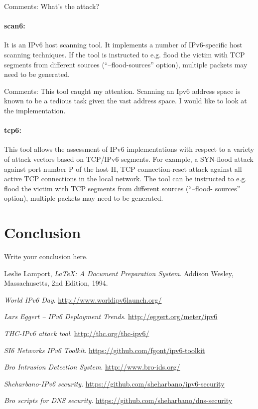 \documentclass{article}
\begin{document}
Comments: What's the attack?

\paragraph*{scan6:} It is an IPv6 host scanning tool. It implements a number of IPv6-specific host scanning techniques. If the tool is instructed to e.g. flood the victim with TCP segments from different sources (“--flood-sources” option), multiple packets may need to be generated.

Comments: This tool caught my attention. Scanning an Ipv6 address space is known to be a tedious task given the vast address space. I would like to look at the implementation.

\paragraph*{tcp6:} This tool allows the assessment of IPv6 implementations with respect to a variety of attack vectors
based on TCP/IPv6 segments. For example, a SYN-flood attack against port number P of the host H, TCP connection-reset attack against all
active TCP connections in the local network.
 The tool can be instructed to e.g. flood the victim with TCP segments from different sources (“--flood-
sources” option), multiple packets may need to be generated.		


\section{Conclusion}
Write your conclusion here.

\begin{thebibliography}{15}

  Leslie Lamport,
  \emph{\LaTeX: A Document Preparation System}.
  Addison Wesley, Massachusetts,
  2nd Edition,
  1994.
  
  \emph{World IPv6 Day}.
  \url{http://www.worldipv6launch.org/}

  \emph{Lars Eggert – IPv6 Deployment Trends}.
  \url{http://eggert.org/meter/ipv6}
  
  \emph{THC-IPv6 attack tool}.
  \url{http://thc.org/thc-ipv6/}
  
  \emph{SI6 Networks IPv6 Toolkit}.
  \url{https://github.com/fgont/ipv6-toolkit}
  
  
  \emph{Bro Intrusion Detection System}.
  \url{  http://www.bro-ids.org/}
  
  \emph{Sheharbano-IPv6 security}.
  \url{https://github.com/sheharbano/ipv6-security}
  
  \emph{Bro scripts for DNS security}.
  \url{https://github.com/sheharbano/dns-security}
    
\end{thebibliography}
\end{document}
